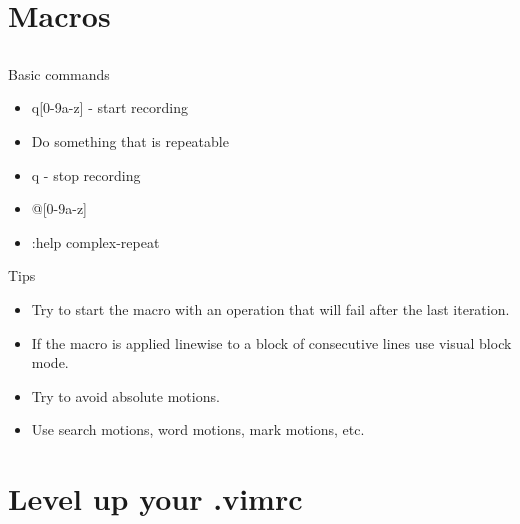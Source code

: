 \documentclass{beamer}
\begin{document}
    \section{Macros}
    \subsection{}
    \begin{frame}{Basic commands}
        \begin{itemize}
            \item q[0-9a-z] - start recording
            \item Do something that is repeatable
            \item q - stop recording
            \item @[0-9a-z]
            \item :help complex-repeat
        \end{itemize}
    \end{frame}
    \begin{frame}{Tips}
        \begin{itemize}
            \item Try to start the macro with an operation that will fail after the last iteration.
            \item If the macro is applied linewise to a block of consecutive lines use visual block mode.
            \item Try to avoid absolute motions.
            \item Use search motions, word motions, mark motions, etc.
        \end{itemize}
    \end{frame}
    \section{Level up your .vimrc}
\end{document}
